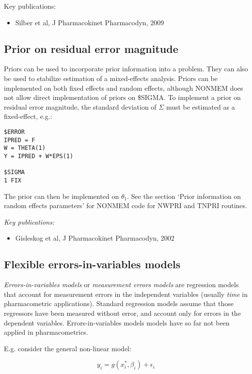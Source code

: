 \documentclass[a4paper,11pt]{article}
\begin{document}
Key publications:
\begin{itemize}
\item Silber et al, J Pharmacokinet Pharmacodyn, 2009
\end{itemize}

\subsection{Prior on residual error magnitude}
Priors can be used to incorporate prior information into a
problem. They can also be used to stabilize estimation of a
mixed-effects analysis. Priors can be implemented on both fixed
effects and random effects, although NONMEM does not allow direct
implementation of priors on \$SIGMA. To implement a prior on residual
error magnitude, the standard deviation of $\Sigma$ must be estimated
as a fixed-effect, e.g.: 

\begin{lstlisting}
$ERROR
IPRED = F
W = THETA(1)
Y = IPRED + W*EPS(1)

$SIGMA
1 FIX
\end{lstlisting}

The prior can then be implemented on $\theta_1$. See the section
`Prior information on random effects parameters' for NONMEM code for
NWPRI and TNPRI routines.

\vspace{10pt}

\noindent \emph{Key publications:}
\begin{itemize}
\item Gisleskog et al, J Pharmacokinet Pharmacodyn, 2002
\end{itemize}


\subsection{Flexible errors-in-variables models}
\emph{Errors-in-variables models} or \emph{measurement errors models}
are regression models that account for measurement errors in the
independent variables (usually \emph{time} in pharmacometric
applications). Standard regression models assume that those regressors
have been measured without error, and account only for errors in the
dependent variables. Errors-in-variables models models have so far not
been applied in pharmacometrics.

\noindent E.g. consider the general non-linear model:

\begin{equation}
y_i = g(x_i^\ast, \beta_i) + \epsilon_i 
\end{equation}
\end{document}
